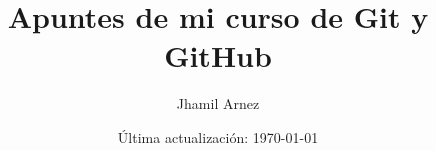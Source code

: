 \documentclass[a4paper,12pt]{book}
\begin{document}
\author{Jhamil Arnez}
\title{Apuntes de mi curso de Git y GitHub}
\date{Última actualización: \today}

\frontmatter
\maketitle
\tableofcontents

\mainmatter



\backmatter
\end{document}
